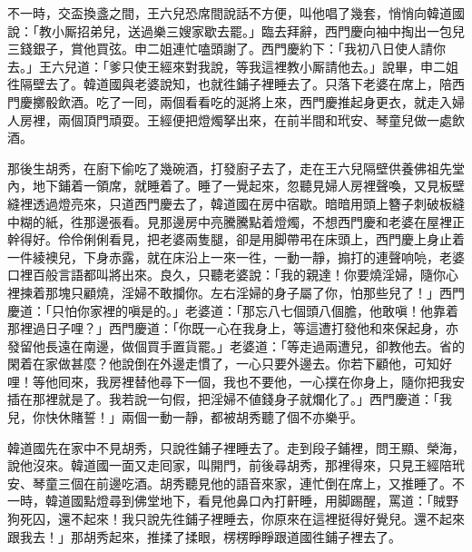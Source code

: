 不一時，交盃換盞之間，王六兒恐席間說話不方便，{}叫他唱了幾套，悄悄向韓道國說：「教小厮招弟兒，送過樂三嫂家歇去罷。」臨去拜辭，西門慶向袖中掏出一包兒三錢銀子，賞他買弦。申二姐連忙嗑頭謝了。西門慶約下：「我初八日使人請你去。」王六兒道：「爹只使王經來對我說，等我這裡教小厮請他去。」說畢，申二姐徃隔壁去了。韓道國與老婆說知，也就徃鋪子裡睡去了。{}只落下老婆在席上，陪西門慶擲骰飲酒。吃了一囘，兩個看看吃的涎將上來，西門慶推起身更衣，就走入婦人房裡，兩個頂門頑耍。王經便把燈燭拏出來，在前半間和玳安、琴童兒做一處飲酒。

那後生胡秀，在廚下偷吃了幾碗酒，{}打發廚子去了，走在王六兒隔壁供養佛祖先堂內，地下鋪着一領席，就睡着了。睡了一覺起來，忽聽見婦人房裡聲喚，又見板壁縫裡透過燈亮來，只道西門慶去了，韓道國在房中宿歇。暗暗用頭上簪子刺破板縫中糊的紙，徃那邊張看。見那邊房中亮騰騰點着燈燭，不想西門慶和老婆在屋裡正幹得好。{}伶伶俐俐看見，把老婆兩隻腿，卻是用脚帶弔在床頭上，西門慶上身止着一件綾襖兒，下身赤露，就在床沿上一來一徃，一動一靜，搧打的連聲响喨，老婆口裡百般言語都叫將出來。良久，只聽老婆說：「我的親達！你要燒淫婦，隨你心裡揀着那塊只顧燒，淫婦不敢攔你。左右淫婦的身子屬了你，怕那些兒了！」西門慶道：「只怕你家裡的嗔是的。」{}老婆道：「那忘八七個頭八個膽，他敢嗔！他靠着那裡過日子哩？」西門慶道：「你既一心在我身上，等這遭打發他和來保起身，亦發留他長遠在南邊，做個買手置貨罷。」{}老婆道：「等走過兩遭兒，卻教他去。省的閑着在家做甚麼？他說倒在外邊走慣了，一心只要外邊去。你若下顧他，可知好哩！等他囘來，我房裡替他尋下一個，我也不要他，一心撲在你身上，隨你把我安插在那裡就是了。我若說一句假，把淫婦不値錢身子就爛化了。」{}西門慶道：「我兒，你快休賭誓！」兩個一動一靜，都被胡秀聽了個不亦樂乎。

韓道國先在家中不見胡秀，只說徃鋪子裡睡去了。走到段子鋪裡，問王顯、榮海，說他沒來。韓道國一面又走囘家，叫開門，前後尋胡秀，那裡得來，只見王經陪玳安、琴童三個在前邊吃酒。胡秀聽見他的語音來家，連忙倒在席上，又推睡了。不一時，韓道國點燈尋到佛堂地下，看見他鼻口內打鼾睡，用脚踢醒，罵道：「賊野狗死囚，還不起來！我只說先徃鋪子裡睡去，你原來在這裡挺得好覺兒。還不起來跟我去！」那胡秀起來，推揉了揉眼，楞楞睜睜跟道國徃鋪子裡去了。


